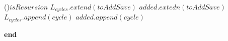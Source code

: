 \begin{algorithm}
{{                    }
                    \vspace*{0.5em}

                    \eIf(){$isResursion$}
                    {
                    }
                    {
                        $L_{cycles}.extend(toAddSave)$\;
                        $added.extedn(toAddSave)$\;
                        {
                            {
                                $L_{cycles}.append(cycle)$\;
                                $added.append(cycle)$\;
                            }
                        }
                    }
                }{\textbf{end}}
            \vspace*{0.5em}

        \end{algorithm}

        \newpage

